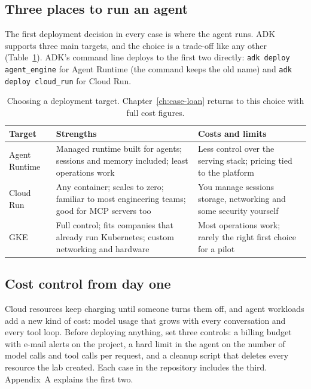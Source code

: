 \subsection{Three places to run an agent}

The first deployment decision in every case is where the agent runs. ADK supports three main targets, and the choice is a trade-off like any other (Table~\ref{tab:targets}). ADK's command line deploys to the first two directly: \texttt{adk deploy agent\_engine} for Agent Runtime (the command keeps the old name) and \texttt{adk deploy cloud\_run} for Cloud Run.

\begin{table}[htbp]
\centering
\small
\caption{Choosing a deployment target. Chapter~\ref{ch:case-loan} returns to this choice with full cost figures.}
\label{tab:targets}
\begin{tabularx}{\textwidth}{@{}>{\raggedright\arraybackslash}p{2.3cm}>{\raggedright\arraybackslash}X>{\raggedright\arraybackslash}X@{}}
\toprule
Target & Strengths & Costs and limits \\
\midrule
Agent Runtime & Managed runtime built for agents; sessions and memory included; least operations work & Less control over the serving stack; pricing tied to the platform \\
Cloud Run & Any container; scales to zero; familiar to most engineering teams; good for MCP servers too & You manage sessions storage, networking and some security yourself \\
GKE & Full control; fits companies that already run Kubernetes; custom networking and hardware & Most operations work; rarely the right first choice for a pilot \\
\bottomrule
\end{tabularx}
\end{table}

\subsection{Cost control from day one}

Cloud resources keep charging until someone turns them off, and agent workloads add a new kind of cost: model usage that grows with every conversation and every tool loop. Before deploying anything, set three controls: a billing budget with e-mail alerts on the project, a hard limit in the agent on the number of model calls and tool calls per request, and a cleanup script that deletes every resource the lab created. Each case in the repository includes the third. Appendix~A explains the first two.

